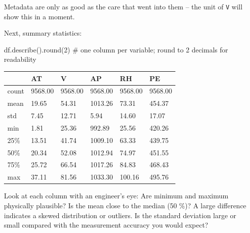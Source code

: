 \documentclass[
  letterpaper,
  DIV=11,
  numbers=noendperiod]{scrreprt}
\newenvironment{Shaded}{\begin{snugshade}}{\end{snugshade}}
\newcommand{\BuiltInTok}[1]{\textcolor[rgb]{0.00,0.23,0.31}{#1}}
\newcommand{\CommentTok}[1]{\textcolor[rgb]{0.37,0.37,0.37}{#1}}
\newcommand{\DecValTok}[1]{\textcolor[rgb]{0.68,0.00,0.00}{#1}}
\newcommand{\NormalTok}[1]{\textcolor[rgb]{0.00,0.23,0.31}{#1}}
\begin{document}
Metadata are only as good as the care that went into them -- the unit of
\texttt{V} will show this in a moment.

Next, summary statistics:

\begin{Shaded}
\begin{Highlighting}[]
\NormalTok{df.describe().}\BuiltInTok{round}\NormalTok{(}\DecValTok{2}\NormalTok{)   }\CommentTok{\# one column per variable; round to 2 decimals for readability}
\end{Highlighting}
\end{Shaded}

\begin{longtable}[]{@{}llllll@{}}
\toprule\noalign{}
& AT & V & AP & RH & PE \\
\midrule\noalign{}
\endhead
\bottomrule\noalign{}
\endlastfoot
count & 9568.00 & 9568.00 & 9568.00 & 9568.00 & 9568.00 \\
mean & 19.65 & 54.31 & 1013.26 & 73.31 & 454.37 \\
std & 7.45 & 12.71 & 5.94 & 14.60 & 17.07 \\
min & 1.81 & 25.36 & 992.89 & 25.56 & 420.26 \\
25\% & 13.51 & 41.74 & 1009.10 & 63.33 & 439.75 \\
50\% & 20.34 & 52.08 & 1012.94 & 74.97 & 451.55 \\
75\% & 25.72 & 66.54 & 1017.26 & 84.83 & 468.43 \\
max & 37.11 & 81.56 & 1033.30 & 100.16 & 495.76 \\
\end{longtable}

\begin{tcolorbox}[enhanced jigsaw, left=2mm, title=\textcolor{quarto-callout-tip-color}{\faLightbulb}\hspace{0.5em}{How to read \texttt{describe()}}, opacityback=0, breakable, rightrule=.15mm, arc=.35mm, toptitle=1mm, colbacktitle=quarto-callout-tip-color!10!white, opacitybacktitle=0.6, coltitle=black, colframe=quarto-callout-tip-color-frame, bottomrule=.15mm, leftrule=.75mm, bottomtitle=1mm, titlerule=0mm, toprule=.15mm, colback=white]

Look at each column with an engineer's eye: Are minimum and maximum
physically plausible? Is the mean close to the median (50 \%)? A large
difference indicates a skewed distribution or outliers. Is the standard
deviation large or small compared with the measurement accuracy you
would expect?

\end{tcolorbox}
\end{document}
